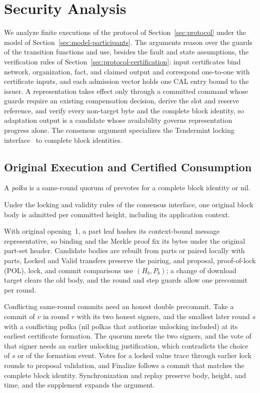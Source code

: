 \section{Security Analysis}
\label{sec:security}

We analyze finite executions of the protocol of Section~\ref{sec:protocol} under the model of Section~\ref{sec:model-participants}. The arguments reason over the guards of the transition functions and use, besides the fault and state assumptions, the verification rules of Section~\ref{sec:protocol-certification}: input certificates bind network, organization, fact, and claimed output and correspond one-to-one with certificate inputs, and each admission vector holds one CAL entry bound to the issuer. A representation takes effect only through a committed command whose guards require an existing compensation decision, derive the slot and reserve reference, and verify every non-target byte and the complete block identity, so adaptation output is a candidate whose availability governs representation progress alone. The consensus argument specializes the Tendermint locking interface~\cite{tendermint} to complete block identities.

\subsection{Original Execution and Certified Consumption}
\label{sec:security-identity}

A \emph{polka} is a same-round quorum of prevotes for a complete block identity or nil.

\begin{lemma}
\label{lem:security-original}
Under the locking and validity rules of the consensus interface, one original block body is admitted per
committed height, including its application context.
\end{lemma}
\begin{IEEEproof}
With original opening~1, a part leaf hashes its context-bound message representative, so binding and the Merkle proof fix its bytes under the original part-set header. Candidate bodies are rebuilt from parts or paired locally with parts, Locked and Valid transfers preserve the pairing, and proposal, proof-of-lock (POL), lock, and commit comparisons use $(H_b,P_b)$; a change of download target clears the old body, and the round and step guards allow one precommit per round.

Conflicting same-round commits need an honest double precommit. Take a commit of $v$ in round $r$ with its two honest signers, and the smallest later round $s$ with a conflicting polka (nil polkas that authorize unlocking included) at its earliest certificate formation. The quorum meets the two signers, and the vote of that signer needs an earlier unlocking justification, which contradicts the choice of $s$ or of the formation event. Votes for a locked value trace through earlier lock rounds to proposal validation, and Finalize follows a commit that matches the complete block identity. Synchronization and replay preserve body, height, and time, and the supplement expands the argument.
\end{IEEEproof}

